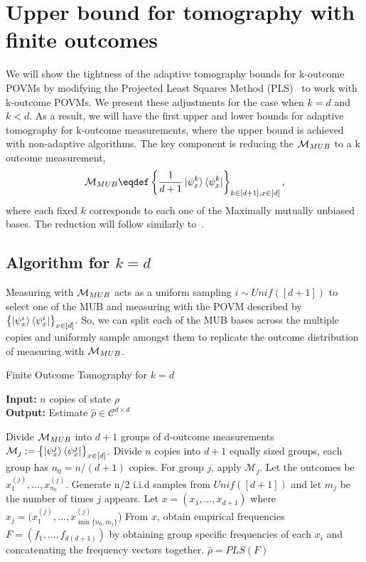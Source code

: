 \newcommand{\MUB}{\POVM_{MUB}}
\section{Upper bound for tomography with finite outcomes}
\label{sec:finite-upper}
We will show the tightness of the adaptive tomography bounds for k-outcome POVMs by modifying the Projected Least Squares Method (PLS)~\cite{guctua2020fast} to work with k-outcome POVMs. We present these adjustments for the case when $k = d$ and $k < d$. As a result, we will have the first upper and lower bounds for adaptive tomography for k-outcome measurements, where the upper bound is achieved with non-adaptive algorithms. The key component is reducing the $\MUB$ to a k outcome measurement,
$$\MUB \eqdef \left\{\frac{1}{d+1} \ket{\psi_x^k} \bra{\psi_x^k}\right\}_{k \in [d+1], x \in [d]},$$
where each fixed $k$ corresponds to each one of the Maximally mutually unbiased bases. The reduction will follow similarly to~\cite{liu2024restricted}.
\subsection{Algorithm for $k=d$} \label{sub-keqd}
Measuring with $\MUB$ acts as a uniform sampling $i \sim Unif([d+1])$ to select one of the MUB and measuring with the POVM described by $\left\{\ket{\psi_x^i} \bra{\psi_x^i}\right\}_{x \in [d]}$. So, we can split each of the MUB bases across the multiple copies and uniformly sample amongst them to replicate the outcome distribution of measuring with $\MUB$. 

\begin{algorithm}
\caption{Finite Outcome Tomography for $k = d$}\label{alg:tom-keqd}
\hspace*{0.1cm} \textbf{Input:} $n$ copies of state $\rho$ \\
\hspace*{0.1cm} \textbf{Output:} Estimate $\hat{\rho} \in \mathcal{C}^{d \times d}$
\begin{algorithmic}
\State Divide $\MUB$ into $d+1$ groups of d-outcome measurements $\mathcal{M}_j := \left\{\ket{\psi_x^j} \bra{\psi_x^j}\right\}_{x \in [d]}$.
\State Divide $n$ copies into $d+1$ equally sized groups, each group has $n_0 = n/(d+1)$ copies.
\State For group $j$, apply $\mathcal{M}_j$. Let the outcomes be $x_1^{(j)}, ..., x_{n_0}^{(j)}$.
\EndFor
\State Generate n/2 i.i.d samples from $Unif([d+1])$ and  let $m_j$ be the number of times $j$ appears.
\State Let $x = (x_1, ..., x_{d+1})$ where $x_j = (x_1^{(j)}, ..., x_{\min\{n_0, m_j\}}^{(j)}$)
\State From $x$, obtain empirical frequencies $F = (f_1, ..., f_{d (d+1)})$ by obtaining group specific frequencies of each $x_i$ and concatenating the frequency vectors together.
\State \Return $\hat{\rho} = PLS(F)$
\end{algorithmic}
\end{algorithm}

